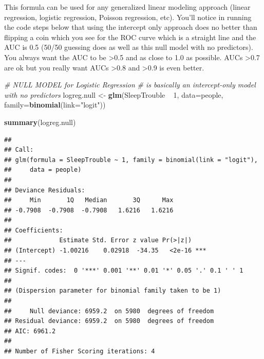 \documentclass[]{article}
\newenvironment{Shaded}{\begin{snugshade}}{\end{snugshade}}
\newcommand{\KeywordTok}[1]{\textcolor[rgb]{0.13,0.29,0.53}{\textbf{{#1}}}}
\newcommand{\DataTypeTok}[1]{\textcolor[rgb]{0.13,0.29,0.53}{{#1}}}
\newcommand{\DecValTok}[1]{\textcolor[rgb]{0.00,0.00,0.81}{{#1}}}
\newcommand{\StringTok}[1]{\textcolor[rgb]{0.31,0.60,0.02}{{#1}}}
\newcommand{\CommentTok}[1]{\textcolor[rgb]{0.56,0.35,0.01}{\textit{{#1}}}}
\newcommand{\NormalTok}[1]{{#1}}
\begin{document}
This formula can be used for any generalized linear modeling approach
(linear regression, logistic regression, Poisson regression, etc).
You'll notice in running the code steps below that using the intercept
only approach does no better than flipping a coin which you see for the
ROC curve which is a straight line and the AUC is 0.5 (50/50 guessing
does as well as this null model with no predictors). You always want the
AUC to be \textgreater{}0.5 and as close to 1.0 as possible. AUCs
\textgreater{}0.7 are ok but you really want AUCs \textgreater{}0.8 and
\textgreater{}0.9 is even better.

\begin{Shaded}
\begin{Highlighting}[]
\CommentTok{# NULL MODEL for Logistic Regression }
\CommentTok{# is basically an intercept-only model with no predictors}
\NormalTok{logreg.null <-}\StringTok{ }\KeywordTok{glm}\NormalTok{(SleepTrouble ~}\StringTok{ }\DecValTok{1}\NormalTok{, }
                   \DataTypeTok{data=}\NormalTok{people, }
                   \DataTypeTok{family=}\KeywordTok{binomial}\NormalTok{(}\DataTypeTok{link=}\StringTok{"logit"}\NormalTok{))}

\KeywordTok{summary}\NormalTok{(logreg.null)}
\end{Highlighting}
\end{Shaded}

\begin{verbatim}
## 
## Call:
## glm(formula = SleepTrouble ~ 1, family = binomial(link = "logit"), 
##     data = people)
## 
## Deviance Residuals: 
##     Min       1Q   Median       3Q      Max  
## -0.7908  -0.7908  -0.7908   1.6216   1.6216  
## 
## Coefficients:
##             Estimate Std. Error z value Pr(>|z|)    
## (Intercept) -1.00216    0.02918  -34.35   <2e-16 ***
## ---
## Signif. codes:  0 '***' 0.001 '**' 0.01 '*' 0.05 '.' 0.1 ' ' 1
## 
## (Dispersion parameter for binomial family taken to be 1)
## 
##     Null deviance: 6959.2  on 5980  degrees of freedom
## Residual deviance: 6959.2  on 5980  degrees of freedom
## AIC: 6961.2
## 
## Number of Fisher Scoring iterations: 4
\end{verbatim}

\begin{Shaded}
\end{Shaded}
\end{document}
